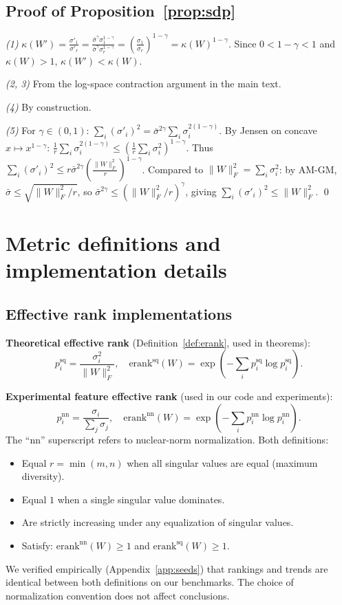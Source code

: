 \documentclass{article}
\newcommand{\erank}{\mathrm{erank}}
\begin{document}
\subsection{Proof of Proposition~\ref{prop:sdp}}

\emph{(1)} $\kappa(W') = \frac{\sigma'_1}{\sigma'_r} = \frac{\bar\sigma^\gamma \sigma_1^{1-\gamma}}{\bar\sigma^\gamma \sigma_r^{1-\gamma}} = \left(\frac{\sigma_1}{\sigma_r}\right)^{1-\gamma} = \kappa(W)^{1-\gamma}.$ Since $0 < 1-\gamma < 1$ and $\kappa(W) > 1$, $\kappa(W') < \kappa(W)$.

\emph{(2, 3)} From the log-space contraction argument in the main text.

\emph{(4)} By construction.

\emph{(5)} For $\gamma \in (0,1)$: $\sum_i (\sigma'_i)^2 = \bar\sigma^{2\gamma}\sum_i \sigma_i^{2(1-\gamma)}$. By Jensen on concave $x \mapsto x^{1-\gamma}$: $\frac{1}{r}\sum_i \sigma_i^{2(1-\gamma)} \leq \left(\frac{1}{r}\sum_i \sigma_i^2\right)^{1-\gamma}$. Thus $\sum_i (\sigma'_i)^2 \leq r\bar\sigma^{2\gamma}\left(\frac{\|W\|_F^2}{r}\right)^{1-\gamma}$. Compared to $\|W\|_F^2 = \sum_i \sigma_i^2$: by AM-GM, $\bar\sigma \leq \sqrt{\|W\|_F^2/r}$, so $\bar\sigma^{2\gamma} \leq (\|W\|_F^2/r)^\gamma$, giving $\sum_i(\sigma'_i)^2 \leq \|W\|_F^2$. \qed

\section{Metric definitions and implementation details}
\label{app:metrics}

\subsection{Effective rank implementations}

\textbf{Theoretical effective rank} (Definition~\ref{def:erank}, used in theorems):
\[
p_i^{\mathrm{sq}} = \frac{\sigma_i^2}{\|W\|_F^2}, \quad \erank^{\mathrm{sq}}(W) = \exp\!\left(-\sum_i p_i^{\mathrm{sq}} \log p_i^{\mathrm{sq}}\right).
\]

\textbf{Experimental feature effective rank} (used in our code and experiments):
\[
p_i^{\mathrm{nn}} = \frac{\sigma_i}{\sum_j \sigma_j}, \quad \erank^{\mathrm{nn}}(W) = \exp\!\left(-\sum_i p_i^{\mathrm{nn}} \log p_i^{\mathrm{nn}}\right).
\]
The ``nn'' superscript refers to nuclear-norm normalization. Both definitions:
\begin{itemize}[nosep]
  \item Equal $r = \min(m,n)$ when all singular values are equal (maximum diversity).
  \item Equal $1$ when a single singular value dominates.
  \item Are strictly increasing under any equalization of singular values.
  \item Satisfy: $\erank^{\mathrm{nn}}(W) \geq 1$ and $\erank^{\mathrm{sq}}(W) \geq 1$.
\end{itemize}
We verified empirically (Appendix~\ref{app:seeds}) that rankings and trends are identical between both definitions on our benchmarks. The choice of normalization convention does not affect conclusions.
\end{document}
